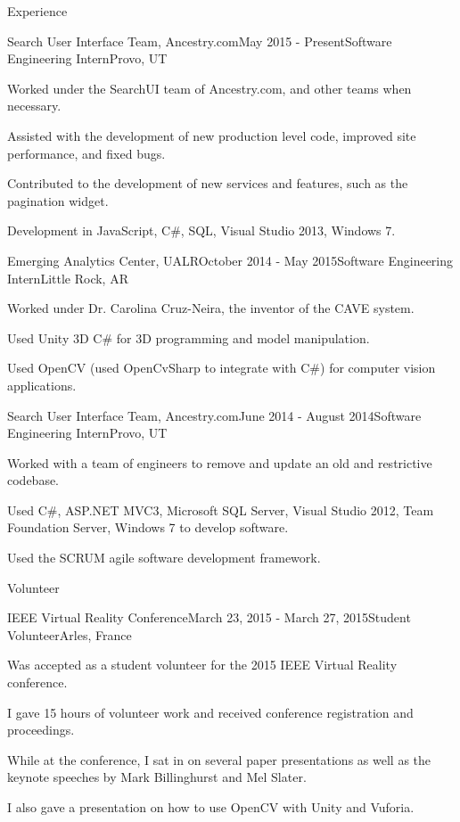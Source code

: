 \documentclass{resume} %
\begin{document}
\begin{rSection}{Experience}

\begin{rSubsection}{Search User Interface Team, Ancestry.com}{May 2015 - Present}{Software Engineering Intern}{Provo, UT}
	\item Worked under the SearchUI team of Ancestry.com, and other teams when necessary.
	\item Assisted with the development of new production level code, improved site performance, and fixed bugs.
	\item Contributed to the development of new services and features, such as the pagination widget.
	\item Development in JavaScript, C\#, SQL, Visual Studio 2013, Windows 7.
\end{rSubsection}

\begin{rSubsection}{Emerging Analytics Center, UALR}{October 2014 - May 2015}{Software Engineering Intern}{Little Rock, AR}
	\item Worked under Dr. Carolina Cruz-Neira, the inventor of the CAVE system.
	\item Used Unity 3D C\# for 3D programming and model manipulation.
	\item Used OpenCV (used OpenCvSharp to integrate with C\#) for computer vision applications.
\end{rSubsection}

\begin{rSubsection}{Search User Interface Team, Ancestry.com}{June 2014 - August 2014}{Software Engineering Intern}{Provo, UT}
	\item Worked with a team of engineers to remove and update an old and restrictive codebase.
	\item Used C\#, ASP.NET MVC3, Microsoft SQL Server, Visual Studio 2012, Team Foundation Server, Windows 7 to develop software.
	\item Used the SCRUM agile software development framework.
\end{rSubsection}

\end{rSection}

\begin{rSection}{Volunteer}

\begin{rSubsection}{IEEE Virtual Reality Conference}{March 23, 2015 - March 27, 2015}{Student Volunteer}{Arles, France}
	\item Was accepted as a student volunteer for the 2015 IEEE Virtual Reality conference.
	\item I gave 15 hours of volunteer work and received conference registration and proceedings.
	\item While at the conference, I sat in on several paper presentations as well as the keynote speeches by Mark Billinghurst and Mel Slater.
	\item I also gave a presentation on how to use OpenCV with Unity and Vuforia.
\end{rSubsection}

\end{rSection}
\end{document}
